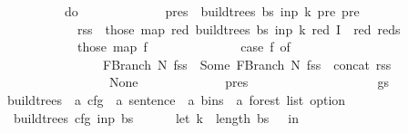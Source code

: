 \begin{isabellebody}
\ \ \ \ \ \ \ \ \ \ do\ {\isacharbraceleft}{\kern0pt}\isanewline
\ \ \ \ \ \ \ \ \ \ \ \ pres\ {\isasymleftarrow}\ build{\isacharunderscore}{\kern0pt}trees{\isacharprime}{\kern0pt}\ bs\ inp\ k{\isacharprime}{\kern0pt}\ pre\ {\isacharbraceleft}{\kern0pt}pre{\isacharbraceright}{\kern0pt}{\isacharsemicolon}{\kern0pt}\isanewline
\ \ \ \ \ \ \ \ \ \ \ \ rss\ {\isasymleftarrow}\ those\ {\isacharparenleft}{\kern0pt}map\ {\isacharparenleft}{\kern0pt}{\isasymlambda}red{\isachardot}{\kern0pt}\ build{\isacharunderscore}{\kern0pt}trees{\isacharprime}{\kern0pt}\ bs\ inp\ k\ red\ {\isacharparenleft}{\kern0pt}I\ {\isasymunion}\ {\isacharbraceleft}{\kern0pt}red{\isacharbraceright}{\kern0pt}{\isacharparenright}{\kern0pt}{\isacharparenright}{\kern0pt}\ reds{\isacharparenright}{\kern0pt}{\isacharsemicolon}{\kern0pt}\isanewline
\ \ \ \ \ \ \ \ \ \ \ \ those\ {\isacharparenleft}{\kern0pt}map\ {\isacharparenleft}{\kern0pt}{\isasymlambda}f{\isachardot}{\kern0pt}\isanewline
\ \ \ \ \ \ \ \ \ \ \ \ \ \ case\ f\ of\isanewline
\ \ \ \ \ \ \ \ \ \ \ \ \ \ \ \ FBranch\ N\ fss\ {\isasymRightarrow}\ Some\ {\isacharparenleft}{\kern0pt}FBranch\ N\ {\isacharparenleft}{\kern0pt}fss\ {\isacharat}{\kern0pt}\ {\isacharbrackleft}{\kern0pt}concat\ rss{\isacharbrackright}{\kern0pt}{\isacharparenright}{\kern0pt}{\isacharparenright}{\kern0pt}\isanewline
\ \ \ \ \ \ \ \ \ \ \ \ \ \ {\isacharbar}{\kern0pt}\ {\isacharunderscore}{\kern0pt}\ {\isasymRightarrow}\ None\isanewline
\ \ \ \ \ \ \ \ \ \ \ \ {\isacharparenright}{\kern0pt}\ pres{\isacharparenright}{\kern0pt}\isanewline
\ \ \ \ \ \ \ \ \ \ {\isacharbraceright}{\kern0pt}\isanewline
\ \ \ \ \ \ \ \ {\isacharparenright}{\kern0pt}\ gs{\isacharparenright}{\kern0pt}{\isacharparenright}{\kern0pt}\isanewline
\ \ \ \ \ \ {\isacharparenright}{\kern0pt}\isanewline
\ \ {\isacharparenright}{\kern0pt}{\isacharparenright}{\kern0pt}{\isachardoublequoteclose}\isanewline
\isanewline
{}\isamarkupfalse%
\ build{\isacharunderscore}{\kern0pt}trees\ {\isacharcolon}{\kern0pt}{\isacharcolon}{\kern0pt}\ {\isachardoublequoteopen}{\isacharprime}{\kern0pt}a\ cfg\ {\isasymRightarrow}\ {\isacharprime}{\kern0pt}a\ sentence\ {\isasymRightarrow}\ {\isacharprime}{\kern0pt}a\ bins\ {\isasymRightarrow}\ {\isacharprime}{\kern0pt}a\ forest\ list\ option{\isachardoublequoteclose}\ \isanewline
\ \ {\isachardoublequoteopen}build{\isacharunderscore}{\kern0pt}trees\ cfg\ inp\ bs\ {\isacharequal}{\kern0pt}\ {\isacharparenleft}{\kern0pt}\isanewline
\ \ \ \ let\ k\ {\isacharequal}{\kern0pt}\ length\ bs\ {\isacharminus}{\kern0pt}\ {}\ in\isanewline

\end{isabellebody}
